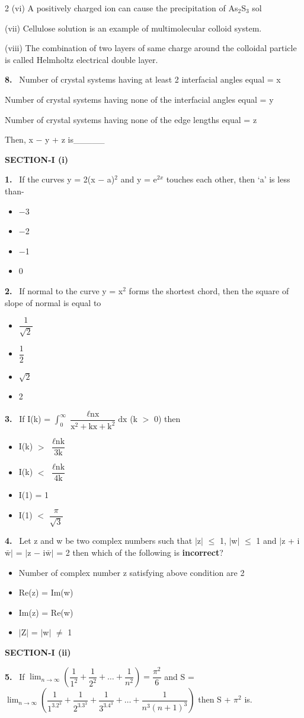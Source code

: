 \documentclass[10pt]{extarticle}
\newcommand{\partsec}[2]{\par\medskip\noindent{\large\bfseries PART-#1: #2}\par\smallskip}
\newcommand{\sect}[1]{\par\smallskip\noindent\textbf{#1}\par}
\newcommand{\qn}[1]{\par\smallskip\noindent\textbf{#1.}~}
\newenvironment{qoptions}{\begin{itemize}[leftmargin=1.8em,itemsep=1pt,topsep=2pt,label={}]}{\end{itemize}}
\newcommand{\opt}[2]{\item[(#1)] #2}
\begin{document}
\begin{multicols}{2}
(vi) A positively charged ion can cause the precipitation of As$_2$S$_3$ sol\par
(vii) Cellulose solution is an example of multimolecular colloid system.\par
(viii) The combination of two layers of same charge around the colloidal particle is called Helmholtz electrical double layer.
\qn{8} Number of crystal systems having at least 2 interfacial angles equal = x\par
Number of crystal systems having none of the interfacial angles equal = y\par
Number of crystal systems having none of the edge lengths equal = z\par
Then, x $-$ y + z is\_\_\_\_\_
\partsec{3}{MATHEMATICS}
\sect{SECTION-I (i)}
\qn{1} If the curves y = 2(x $-$ a)$^2$ and y = e$^{2x}$ touches each other, then `a' is less than-
\begin{qoptions}
\opt{A}{$-$3}
\opt{B}{$-$2}
\opt{C}{$-$1}
\opt{D}{0}
\end{qoptions}
\qn{2} If normal to the curve y = x$^2$ forms the shortest chord, then the square of slope of normal is equal to
\begin{qoptions}
\opt{A}{$\dfrac{1}{\sqrt{2}}$}
\opt{B}{$\dfrac{1}{2}$}
\opt{C}{$\sqrt{2}$}
\opt{D}{2}
\end{qoptions}
\qn{3} If I(k) = $\displaystyle\int_0^\infty\dfrac{\ell\text{nx}}{\text{x}^2 + \text{kx} + \text{k}^2}\text{dx}$ (k $>$ 0) then
\begin{qoptions}
\opt{A}{I(k) $>$ $\dfrac{\ell\text{nk}}{3\text{k}}$}
\opt{B}{I(k) $<$ $\dfrac{\ell\text{nk}}{4\text{k}}$}
\opt{C}{I(1) = 1}
\opt{D}{I(1) $<$ $\dfrac{\pi}{\sqrt{3}}$}
\end{qoptions}
\qn{4} Let z and w be two complex numbers such that $|$z$|$ $\leq$ 1, $|$w$|$ $\leq$ 1 and $|$z + i$\bar{\text{w}}|$ = $|$z $-$ i$\bar{\text{w}}|$ = 2 then which of the following is \textbf{incorrect}?
\begin{qoptions}
\opt{A}{Number of complex number z satisfying above condition are 2}
\opt{B}{Re(z) = Im(w)}
\opt{C}{Im(z) = Re(w)}
\opt{D}{$|$Z$|$ = $|$w$|$ $\neq$ 1}
\end{qoptions}
\sect{SECTION-I (ii)}
\qn{5} If $\displaystyle\lim_{n\to\infty}\left(\dfrac{1}{1^2} + \dfrac{1}{2^2} + \ldots + \dfrac{1}{n^2}\right) = \dfrac{\pi^2}{6}$ and S = $\displaystyle\lim_{n\to\infty}\left(\dfrac{1}{1^3.2^3} + \dfrac{1}{2^3.3^3} + \dfrac{1}{3^3.4^3} + \ldots + \dfrac{1}{n^3(n+1)^3}\right)$ then S + $\pi^2$ is.
\begin{qoptions}

\end{qoptions}
\end{multicols}
\end{document}
